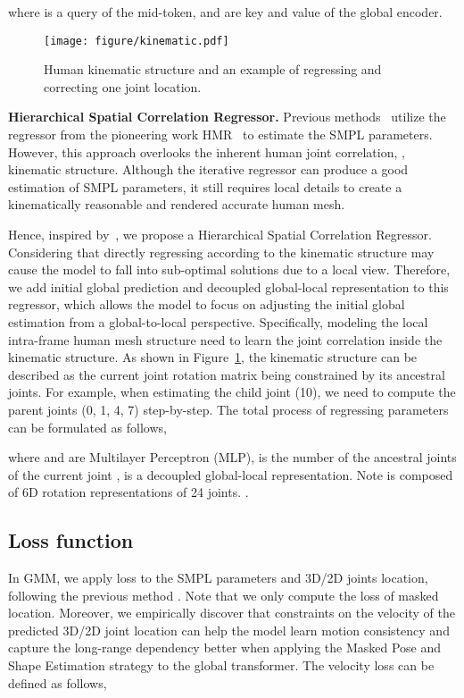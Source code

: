 \documentclass[10pt,twocolumn,letterpaper]{article}
\begin{document}
	where  is a query of the mid-token,  and  are key and value of the global encoder.


	\begin{figure}[!t]
		\centering
		\texttt{[image: figure/kinematic.pdf]}
		\caption{
			Human kinematic structure and an example of regressing and correcting one joint location.
		}
\label{fig:kinematic}
		\vspace{-1em}
	\end{figure}
	
	\noindent\textbf{Hierarchical Spatial Correlation Regressor.}
	\label{sef:hscr}
Previous methods~\cite{VIBE, TCMR, MPS-net} utilize the regressor from the pioneering work HMR~\cite{HMR} to estimate the SMPL parameters. However, this approach overlooks the inherent human joint correlation, \ie, kinematic structure. Although the iterative regressor can produce a good estimation of SMPL parameters, it still requires local details to create a kinematically reasonable and rendered accurate human mesh.
	
	Hence, inspired by~\cite{ZiniuWan2021EncoderDecoderWM}, we propose a Hierarchical Spatial Correlation Regressor. Considering that directly regressing  according to the kinematic structure may cause the model to fall into sub-optimal solutions due to a local view. Therefore, we add initial global prediction and decoupled global-local representation to this regressor, which allows the model to focus on adjusting the initial global estimation from a global-to-local perspective. 
	Specifically, modeling the local intra-frame human mesh structure need to learn the joint correlation inside the kinematic structure. As shown in Figure~\ref{fig:kinematic}, the kinematic structure can be described as the current joint rotation matrix being constrained by its ancestral joints. For example, when estimating the child joint (10), we need to compute the parent joints (0, 1, 4, 7) step-by-step.
	The total process of regressing parameters can be formulated as follows,
	
	where  and  are Multilayer Perceptron (MLP),  is the number of the ancestral joints of the current joint ,  is a decoupled global-local representation. Note  is composed of 6D rotation representations of 24 joints.
	.
	
	
	\subsection{Loss function}
	In GMM, we apply  loss to the SMPL parameters  and 3D/2D joints location, following the previous method \cite{VIBE, MPS-net, TCMR}. Note that we only compute the loss of masked location. Moreover, we empirically discover that constraints on the velocity of the predicted 3D/2D joint location can help the model learn motion consistency and capture the long-range dependency better when applying the Masked Pose and Shape Estimation strategy to the global transformer. The velocity loss can be defined as follows,
	
\end{document}
